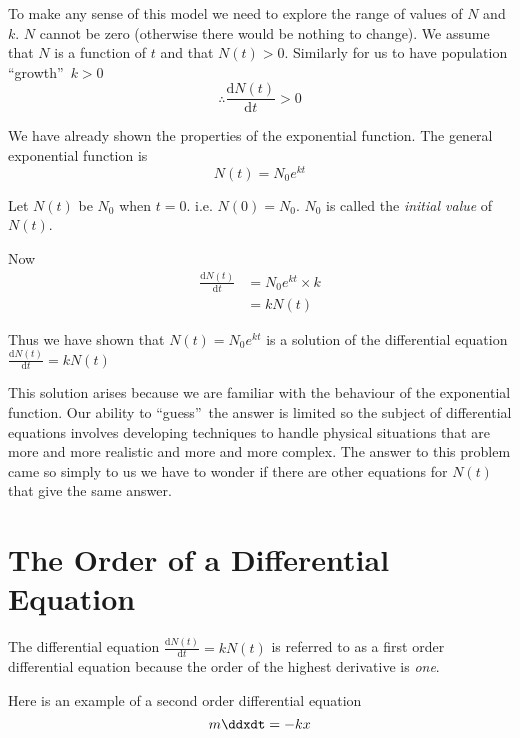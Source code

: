 To make any sense of this model we need to explore the range of values of $N$ and $k$.  $N$ cannot be zero (otherwise there would be nothing to change).  We assume that $N$ is a function of $t$ and that $N (t) >0$.  Similarly for us to have population ``growth''\  $k >0$
\begin{equation*} \therefore \frac{\mathrm{d} N (t)}{\mathrm{d} t} >0
\end{equation*}

We have already shown the properties of the exponential function.  The general exponential function is
\begin{equation*}N (t) =N_{0} e^{k t}
\end{equation*}

Let $N (t)$ be $N_{0}$ when $t =0$.  i.e. $N (0) =N_{0}\text{.}$  $N_{0}$ is called the \emph{initial value} of $N (t)$. 

Now
\begin{align*}\frac{\mathrm{d} N (t)}{\mathrm{d} t} &    = N_{0} e^{k t} \times k \\
 &    = k N (t)\end{align*}

Thus we have shown that $N (t) =N_{0} e^{k t}$ is a solution of the differential equation $\frac{\mathrm{d} N (t)}{\mathrm{d} t} =k N (t)$ 

This solution arises because we are familiar with the behaviour of the exponential function.  Our ability to ``guess''\ the answer is limited so the subject of differential equations involves developing techniques to handle physical situations that are more and more realistic and more and more complex.  The answer to this problem came so simply to us we have to wonder if there are other equations for $N (t)$ that give the same answer. 

\section*{The Order of a Differential Equation}
The differential equation $\frac{\mathrm{d} N (t)}{\mathrm{d} t} =k N (t)$ is referred to as a first order differential equation because the order of the highest derivative is \emph{one}.

Here is an example of a second order differential equation
\begin{equation*}m \ddxdt= -k x\end{equation*}

